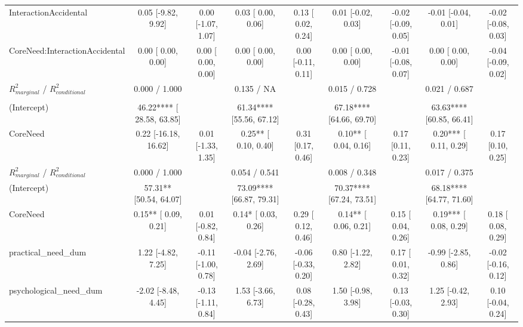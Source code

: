 \begin{table}
\begin{minipage}[t][\textheight][t]{\textwidth}
{\begin{tabular}[t]{lcccccccc}
\hspace{1em}InteractionAccidental & 0.05 [-9.82,  9.92] & 0.00 [-1.07, 1.07] & 0.03 [ 0.00,  0.06] & 0.13 [ 0.02, 0.24] & 0.01 [-0.02,  0.03] & -0.02 [-0.09, 0.05] & -0.01 [-0.04,  0.01] & -0.02 [-0.08, 0.03]\\
\hspace{1em}CoreNeed:InteractionAccidental & 0.00 [ 0.00,  0.00] & 0.00 [ 0.00, 0.00] & 0.00 [ 0.00,  0.00] & 0.00 [-0.11, 0.11] & 0.00 [ 0.00,  0.00] & -0.01 [-0.08, 0.07] & 0.00 [ 0.00,  0.00] & -0.04 [-0.09, 0.02]\\
\hspace{1em}$R^2_{marginal}$ / $R^2_{conditional}$ & 0.000 / 1.000 &  & 0.135 / NA &  & 0.015 / 0.728 &  & 0.021 / 0.687 & \\
\addlinespace[0.3em]
\multicolumn{9}{l}{\textbf{Need Type}}\\
\hspace{1em}(Intercept) & 46.22**** [ 28.58, 63.85] &  & 61.34**** [55.56, 67.12] &  & 67.18**** [64.66, 69.70] &  & 63.63**** [60.85, 66.41] & \\
\hspace{1em}CoreNeed & 0.22 [-16.18, 16.62] & 0.01 [-1.33, 1.35] & 0.25** [ 0.10,  0.40] & 0.31 [0.17, 0.46] & 0.10** [ 0.04,  0.16] & 0.17 [0.11, 0.23] & 0.20*** [ 0.11,  0.29] & 0.17 [0.10, 0.25]\\
\hspace{1em}$R^2_{marginal}$ / $R^2_{conditional}$ & 0.000 / 1.000 &  & 0.054 / 0.541 &  & 0.008 / 0.348 &  & 0.017 / 0.375 & \\
\hspace{1em}(Intercept) & 57.31** [50.54, 64.07] &  & 73.09**** [66.87, 79.31] &  & 70.37**** [67.24, 73.51] &  & 68.18**** [64.77, 71.60] & \\
\hspace{1em}CoreNeed & 0.15** [ 0.09,  0.21] & 0.01 [-0.82, 0.84] & 0.14* [ 0.03,  0.26] & 0.29 [ 0.12, 0.46] & 0.14** [ 0.06,  0.21] & 0.15 [ 0.04, 0.26] & 0.19*** [ 0.08,  0.29] & 0.18 [ 0.08, 0.29]\\
\hspace{1em}practical_need_dum & 1.22 [-4.82,  7.25] & -0.11 [-1.00, 0.78] & -0.04 [-2.76,  2.69] & -0.06 [-0.33, 0.20] & 0.80 [-1.22,  2.82] & 0.17 [ 0.01, 0.32] & -0.99 [-2.85,  0.86] & -0.02 [-0.16, 0.12]\\
\hspace{1em}psychological_need_dum & -2.02 [-8.48,  4.45] & -0.13 [-1.11, 0.84] & 1.53 [-3.66,  6.73] & 0.08 [-0.28, 0.43] & 1.50 [-0.98,  3.98] & 0.13 [-0.03, 0.30] & 1.25 [-0.42,  2.93] & 0.10 [-0.04, 0.24]\\

\end{tabular}}
\end{minipage}
\end{table}
